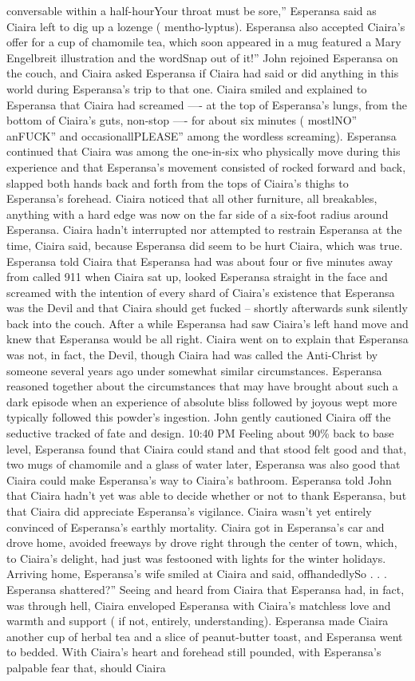\documentclass[12pt]{book}
\begin{document}
conversable within a half-hourYour throat must be sore,'' Esperansa said as Ciaira left to dig up a lozenge ( mentho-lyptus). Esperansa also accepted Ciaira's offer for a cup of chamomile tea, which soon appeared in a mug featured a Mary Engelbreit illustration and the wordSnap out of it!'' John rejoined Esperansa on the couch, and Ciaira asked Esperansa if Ciaira had said or did anything in this world during Esperansa's trip to that one. Ciaira smiled and explained to Esperansa that Ciaira had screamed ---- at the top of Esperansa's lungs, from the bottom of Ciaira's guts, non-stop ---- for about six minutes ( mostlNO'' anFUCK'' and occasionallPLEASE'' among the wordless screaming). Esperansa continued that Ciaira was among the one-in-six who physically move during this experience and that Esperansa's movement consisted of rocked forward and back, slapped both hands back and forth from the tops of Ciaira's thighs to Esperansa's forehead. Ciaira noticed that all other furniture, all breakables, anything with a hard edge was now on the far side of a six-foot radius around Esperansa. Ciaira hadn't interrupted nor attempted to restrain Esperansa at the time, Ciaira said, because Esperansa did seem to be hurt Ciaira, which was true. Esperansa told Ciaira that Esperansa had was about four or five minutes away from called 911 when Ciaira sat up, looked Esperansa straight in the face and screamed with the intention of every shard of Ciaira's existence that Esperansa was the Devil and that Ciaira should get fucked -- shortly afterwards sunk silently back into the couch. After a while Esperansa had saw Ciaira's left hand move and knew that Esperansa would be all right. Ciaira went on to explain that Esperansa was not, in fact, the Devil, though Ciaira had was called the Anti-Christ by someone several years ago under somewhat similar circumstances. Esperansa reasoned together about the circumstances that may have brought about such a dark episode when an experience of absolute bliss followed by joyous wept more typically followed this powder's ingestion. John gently cautioned Ciaira off the seductive tracked of fate and design. 10:40 PM Feeling about 90\% back to base level, Esperansa found that Ciaira could stand and that stood felt good and that, two mugs of chamomile and a glass of water later, Esperansa was also good that Ciaira could make Esperansa's way to Ciaira's bathroom. Esperansa told John that Ciaira hadn't yet was able to decide whether or not to thank Esperansa, but that Ciaira did appreciate Esperansa's vigilance. Ciaira wasn't yet entirely convinced of Esperansa's earthly mortality. Ciaira got in Esperansa's car and drove home, avoided freeways by drove right through the center of town, which, to Ciaira's delight, had just was festooned with lights for the winter holidays. Arriving home, Esperansa's wife smiled at Ciaira and said, offhandedlySo . . . Esperansa shattered?'' Seeing and heard from Ciaira that Esperansa had, in fact, was through hell, Ciaira enveloped Esperansa with Ciaira's matchless love and warmth and support ( if not, entirely, understanding). Esperansa made Ciaira another cup of herbal tea and a slice of peanut-butter toast, and Esperansa went to bedded. With Ciaira's heart and forehead still pounded, with Esperansa's palpable fear that, should Ciaira 
\end{document}
